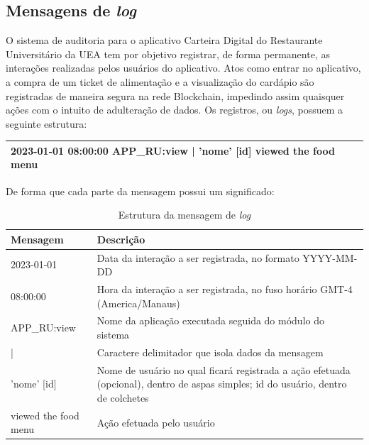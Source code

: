\subsection{Mensagens de \emph{log}}
O sistema de auditoria para o aplicativo Carteira Digital do Restaurante Universitário da UEA tem por objetivo registrar, de forma permanente, as interações realizadas pelos usuários do aplicativo. Atos como entrar no aplicativo, a compra de um ticket de alimentação e a visualização do cardápio são registradas de maneira segura na rede Blockchain, impedindo assim quaisquer ações com o intuito de adulteração de dados. Os registros, ou \emph{logs}, possuem a seguinte estrutura:

\begin{table}[H]
    \centering
    \begin{tabular}{| p{14cm} |}
        \hline
         2023-01-01 08:00:00 APP\_RU:view | 'nome' [id] viewed the food menu \\
        \hline
    \end{tabular}
    \label{tab:estrutura_log}
\end{table}
De forma que cada parte da mensagem possui um significado:
\begin{table}[H]
    \centering
    \begin{tabular}{ | p{4cm} | p{10cm} |}
        \hline
        \textbf{Mensagem} & \textbf{Descrição}\\
        \hline
        
        2023-01-01 & Data da interação a ser registrada, no formato YYYY-MM-DD \\
        \hline

        08:00:00 & Hora da interação a ser registrada, no fuso horário GMT-4 (America/Manaus) \\
        \hline

        APP\_RU:view & Nome da aplicação executada seguida do módulo do sistema \\
        \hline

        | & Caractere delimitador que isola dados da mensagem \\
        \hline

        'nome' {[}id{]} & Nome de usuário no qual ficará registrada a ação efetuada (opcional), dentro de aspas simples; id do usuário, dentro de colchetes \\
        \hline      

        viewed the food menu & Ação efetuada pelo usuário \\
        \hline      
    \end{tabular}
    \caption{Estrutura da mensagem de \emph{log}}
    \label{tab:estrutura_log}
\end{table}

